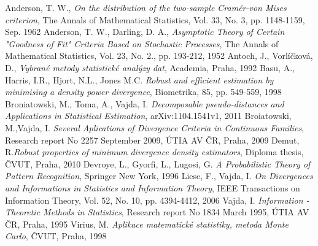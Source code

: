 \begin{thebibliography}{10}

%

Anderson, T. W., {\em On the distribution of the two-sample Cram\'er-von Mises criterion}, The Annals of Mathematical Statistics, Vol. 33, No. 3, pp. 1148-1159, Sep. 1962
Anderson, T. W., Darling, D. A., {\em Asymptotic Theory of Certain "Goodness of Fit" Criteria Based on Stochastic Processes}, The Annals of Mathematical Statistics, Vol. 23, No. 2., pp. 193-212, 1952
Antoch, J., Vorlíčková, D., {\em Vybrané metody statistické analýzy dat}, Academia, Praha, 1992
Basu, A., Harris, I.R., Hjort, N.L., Jones M.C. {\em Robust and efficient estimation by minimising a density power divergence}, Biometrika, 85, pp. 549-559, 1998
Broniatowski, M., Toma, A., Vajda, I. {\em Decomposable pseudo-distances and Applications in Statistical Estimation}, arXiv:1104.1541v1, 2011
Broiatowski, M.,Vajda, I. {\em Several Aplications of Divergence Criteria in Continuous Families}, Research report No 2257 September 2009, ÚTIA AV ČR, Praha, 2009
Demut, R.{\em Robust properties of minimum divergence density estimators}, Diploma thesis, ČVUT, Praha, 2010
Devroye, L., Gyorfi, L., Lugosi, G. {\em A Probabilistic Theory of Pattern Recognition},
Springer New York, 1996
Liese, F., Vajda, I. {\em On Divergences and Informations in Statistics and Information Theory}, IEEE Transactions on Information Theory, Vol. 52, No. 10, pp. 4394-4412, 2006
Vajda, I. {\em Information - Theoretic Methods in Statistics}, Research report No 1834 March 1995, ÚTIA AV ČR, Praha, 1995
Virius, M. {\em Aplikace matematické statistiky, metoda Monte Carlo}, ČVUT, Praha, 1998


\end{thebibliography}